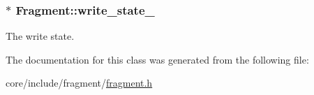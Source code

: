 \subsubsection[{write\+\_\+state\+\_\+}]{$\ast$ Fragment\+::write\+\_\+state\+\_\+\hspace{0.3cm}{\ttfamily [private]}}\label{classFragment_a2dafed41f6f3d9f361ca735d9a38e7e6}
The write state. 

The documentation for this class was generated from the following file\+:\begin{DoxyCompactItemize}
\item 
core/include/fragment/\hyperlink{fragment_8h}{fragment.\+h}\end{DoxyCompactItemize}
